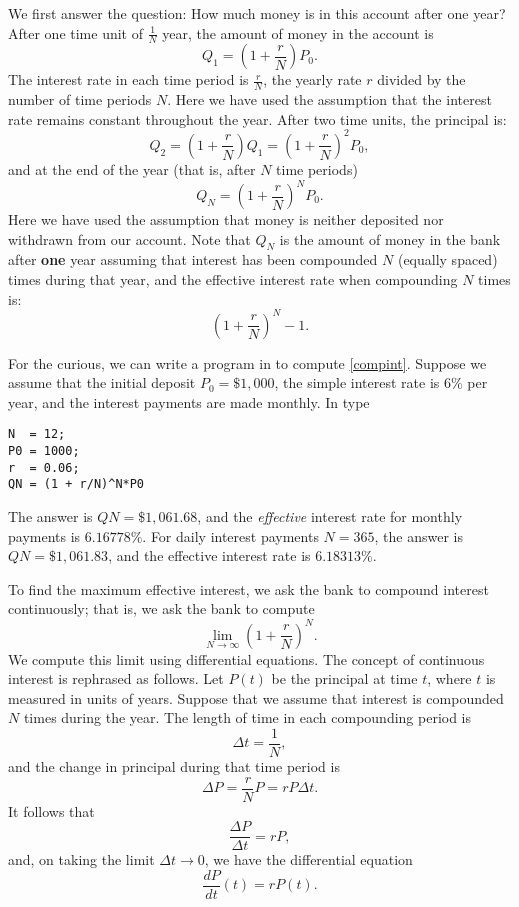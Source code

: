 \documentclass{ximera}
\begin{document}
We first answer the question: How much money is in this account after
one year?  After one time unit of $\frac{1}{N}$ year, the amount of
money in the account is
\[
Q_1 = \left(1+\frac{r}{N}\right)P_0.
\]
The interest rate in each time period is $\frac{r}{N}$,
the yearly rate $r$ divided by the number of time periods $N$.  Here
we have used the assumption that the interest rate remains constant
throughout the year.  After two time units, the principal is:
\[
Q_2 = \left(1+\frac{r}{N}\right)Q_1 = \left(1+\frac{r}{N}\right)^2P_0,
\]
and at the end of the year (that is, after $N$ time periods)
\begin{equation} \label{compint}
Q_N = \left(1+\frac{r}{N}\right)^N P_0.
\end{equation}
Here we have used the assumption that money is neither deposited nor
withdrawn from our account.   Note that $Q_N$ is the amount of money
in the bank after {\bf one} year assuming that interest has been
compounded $N$ (equally spaced) times during that year, and the effective
interest rate when compounding $N$ times is:
\[
\left(1+\frac{r}{N}\right)^N - 1.
\]

For the curious, we can write a program in \Matlab to compute
\eqref{compint}.  Suppose we assume that the initial deposit $P_0=\$1,000$,
the simple interest rate is $6\%$ per year, and the interest payments
are made monthly. In \Matlab type
\begin{verbatim}
N  = 12;
P0 = 1000;
r  = 0.06;
QN = (1 + r/N)^N*P0
\end{verbatim}
The answer is $QN=\$1,061.68$, and the {\em effective\/}
interest rate for monthly payments is $6.16778\%$.  For daily
interest payments $N=365$, the answer is $QN=\$1,061.83$, and
the effective interest rate is $6.18313\%$.

To find the maximum effective interest, we ask the bank to compound interest
continuously; that is, we ask the bank to compute
\[
\lim_{N\to\infty} \left(1 + \frac{r}{N}\right)^N.
\]
We compute this limit using differential equations.  The concept of
continuous interest is rephrased as follows.  Let $P(t)$ be the
principal at time $t$, where $t$ is measured in units of years.
Suppose that we assume that interest is compounded $N$ times during
the year.  The length of time in each compounding period is
\[
\Delta t = \frac{1}{N},
\]
and the change in principal during that time period is
\[
\Delta P = \frac{r}{N} P = rP\Delta t.
\]
It follows that
\[
\frac{\Delta P}{\Delta t} = rP,
\]
and, on taking the limit $\Delta t \to 0$, we have the differential equation
\[
\frac{dP}{dt}(t) = rP(t).
\]
\end{document}
